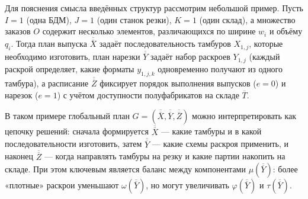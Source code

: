 Для пояснения смысла введённых структур рассмотрим небольшой пример.
Пусть $I=1$ (одна БДМ), $J=1$ (один станок резки), $K=1$ (один склад), а множество заказов $O$ содержит несколько элементов, различающихся по ширине $w_i$ и объёму $q_i$.
Тогда план выпуска $\overline{\overline{X}}$ задаёт последовательность тамбуров $X_{1,j}$, которые необходимо изготовить, план нарезки $\overline{\overline{Y}}$ задаёт набор раскроев $Y_{1,j}$ (каждый раскрой определяет, какие форматы $y_{1,j,k}$ одновременно получают из одного тамбура), а расписание $\overline{\overline{Z}}$ фиксирует порядок выполнения выпусков ($e=0$) и нарезок ($e=1$) с учётом доступности полуфабрикатов на складе $\overline{T}$.

В таком примере глобальный план $G = (\overline{\overline{X}}, \overline{\overline{Y}}, \overline{\overline{Z}})$ можно интерпретировать как цепочку решений: сначала формируется $\overline{\overline{X}}$ --- какие тамбуры и в какой последовательности изготовить, затем $\overline{\overline{Y}}$ --- какие схемы раскроя применить, и наконец $\overline{\overline{Z}}$ --- когда направлять тамбуры на резку и какие партии накопить на складе.
При этом ключевым является баланс между компонентами $\mu(\overline{\overline{Y}})$: более «плотные» раскрои уменьшают $\omega(\overline{\overline{Y}})$, но могут увеличивать $\varphi(\overline{\overline{Y}})$ и $\tau(\overline{\overline{Y}})$.

